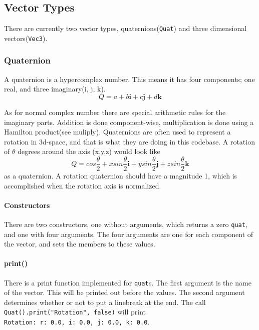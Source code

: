 \documentclass{article}
\begin{document}
\subsection{Vector Types}
There are currently two vector types, quaternions(\verb|Quat|) and three dimensional vectors(\verb|Vec3|).


\subsubsection*{Quaternion}
A quaternion is a hypercomplex number. This means it has four components; one real, and three imaginary(i, j, k).
\begin{equation}
	Q = a + b\mathbf{i} + c\mathbf{j} + d\mathbf{k}
\end{equation}

As for normal complex number there are special arithmetic rules for the imaginary parts. Addition is done component-wise, multiplication is done using a
Hamilton product(see muliply). Quaternions are often used to represent a rotation in 3d-space, and that is what they are doing in this codebase. A rotation of $\theta$ degrees around
the axis (x,y,z) would look like
\begin{equation}
	Q=cos\frac{\theta}{2} + xsin\frac{\theta}{2}\mathbf{i} + ysin\frac{\theta}{2}\mathbf{j} + zsin\frac{\theta}{2}\mathbf{k}
\end{equation}
as a quaternion. A rotation quaternion should have a magnitude 1, which is accomplished when the rotation axis is normalized.

\paragraph*{Constructors}
There are two constructors, one without arguments, which returns a zero \verb|quat|, and one with four arguments. The four arguments are one for each component of the vector,
and sets the members to these values.

\paragraph*{print()}
There is a print function implemented for \verb|quat|s. The first argument is the name of the vector. This will be printed out before the values. The second argument determines
whether or not to put a linebreak at the end. The call \verb|Quat().print("Rotation", false)| will print\\
\verb|Rotation: r: 0.0, i: 0.0, j: 0.0, k: 0.0|.
\end{document}
